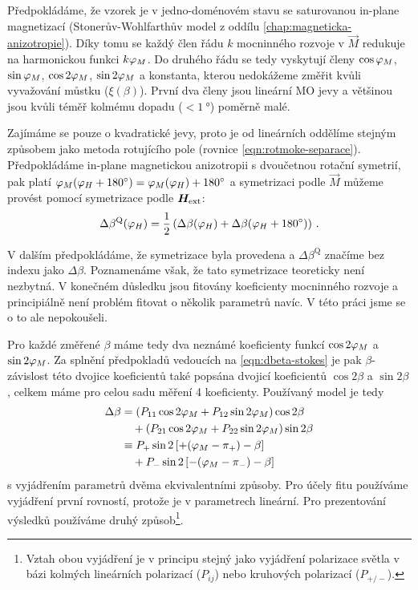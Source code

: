 Předpokládáme, že vzorek je v jedno-doménovém stavu se saturovanou in-plane magnetizací (Stonerův-Wohlfarthův model z oddílu \ref{chap:magneticka-anizotropie}).
Díky tomu se každý člen řádu $k$ mocninného rozvoje v $\vec{M}$ redukuje na harmonickou funkci $k\varphi_M$.
Do druhého řádu se tedy vyskytují členy $\cos\varphi_M$, $\sin\varphi_M$, $\cos2\varphi_M$, $\sin2\varphi_M$ a konstanta, kterou nedokážeme změřit kvůli vyvažování můstku ($\xi(\beta)$).
První dva členy jsou lineární MO jevy a většinou jsou kvůli téměř kolmému dopadu ($< \SI{1}{\degree}$) poměrně malé.

Zajímáme se pouze o kvadratické jevy, proto je od lineárních oddělíme stejným způsobem jako metoda rotujícího pole (rovnice \eqref{eqn:rotmoke-separace}).
Předpokládáme in-plane magnetickou anizotropii s dvoučetnou rotační symetrií, pak platí $\varphi_M(\varphi_H+\SI{180}{\degree})=\varphi_M(\varphi_H)+\SI{180}{\degree}$ a symetrizaci podle $\vec{M}$ můžeme provést pomocí symetrizace podle $\bm{H}_\textrm{ext}$:
\begin{equation}
    \label{eqn:symetrizace-H}
    \Delta\beta^\textrm{Q}(\varphi_H) = \frac{1}{2}\left(\Delta\beta(\varphi_H) + \Delta\beta(\varphi_H+\SI{180}{\degree})\right) \,.
\end{equation}

V dalším předpokládáme, že symetrizace byla provedena a $\Delta\beta^\textrm{Q}$ značíme bez indexu jako $\Delta\beta$.
Poznamenáme však, že tato symetrizace teoreticky není nezbytná.
V konečném důsledku jsou fitovány koeficienty mocninného rozvoje a principiálně není problém fitovat o několik parametrů navíc.
V této práci jsme se o to ale nepokoušeli.

Pro každé změřené $\beta$ máme tedy dva neznámé koeficienty funkcí $\cos2\varphi_M$ a $\sin2\varphi_M$.
Za splnění předpokladů vedoucích na \eqref{eqn:dbeta-stokes} je pak $\beta$-závislost této dvojice koeficientů také popsána dvojicí koeficientů $\cos2\beta$ a $\sin2\beta$, celkem máme pro celou sadu měření 4 koeficienty.
Používaný model je tedy
\begin{equation}
    \label{eqn:PMLD-matice}
    \begin{split}
    \Delta\beta &= \left(P_{11} \cos2\varphi_M + P_{12}\sin2\varphi_M\right)\cos2\beta \\
                    & \quad + \left(P_{21}\cos2\varphi_M + P_{22}\sin2\varphi_M\right)\sin2\beta \\
                    &\equiv P_+ \sin2\left[+(\varphi_M -\pi_+) - \beta\right] \\
                    & \quad + P_- \sin2\left[-(\varphi_M-\pi_-) - \beta\right]
    \end{split}
\end{equation}
s vyjádřením parametrů dvěma ekvivalentními způsoby.
Pro účely fitu používáme vyjádření první rovností, protože je v parametrech lineární.
Pro prezentování výsledků používáme druhý způsob\footnote{Vztah obou vyjádření je v principu stejný jako vyjádření polarizace světla v bázi kolmých lineárních polarizací ($P_{ij}$) nebo kruhových polarizací ($P_{+/-}$).}.

